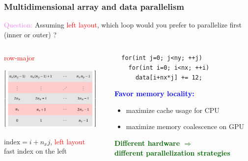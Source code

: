 \begin{frame}[fragile=singleslide]
  \frametitle{Multidimensional array and data parallelism}

  \begin{block}{}
    {\large \textcolor{violet}{Question:}
    Assuming \textcolor{red}{left layout}, which loop would you prefer to parallelize first (inner or outer) ?}    
  \end{block}
  
  \begin{columns}
    \begin{column}{0.45\textwidth}
      \begin{center}
        \textcolor{red}{\large row-major}
        
        \includegraphics[width=5cm]{images/tikz/row-major}

        $\text{index} = i + n_x j$, \textcolor{red}{left layout}\\
        fast index on the left
      \end{center}
    \end{column}
    \begin{column}{0.48\textwidth}
\begin{verbatim}
  for(int j=0; j<ny; ++j)
    for(int i=0; i<nx; ++i)
      data[i+nx*j] += 12;
\end{verbatim}
\begin{center}
  \textcolor{blue}{\bf Favor memory locality:}
\end{center}
\begin{itemize}
\item maximize cache usage for CPU
\item maximize memory coalescence on GPU
\end{itemize}
\begin{center}
  \textcolor{darkgreen}{\bf Different hardware $\Rightarrow$ \\ different parallelization strategies}
\end{center}
\end{column}
    \hfill
  \end{columns}
\end{frame}

